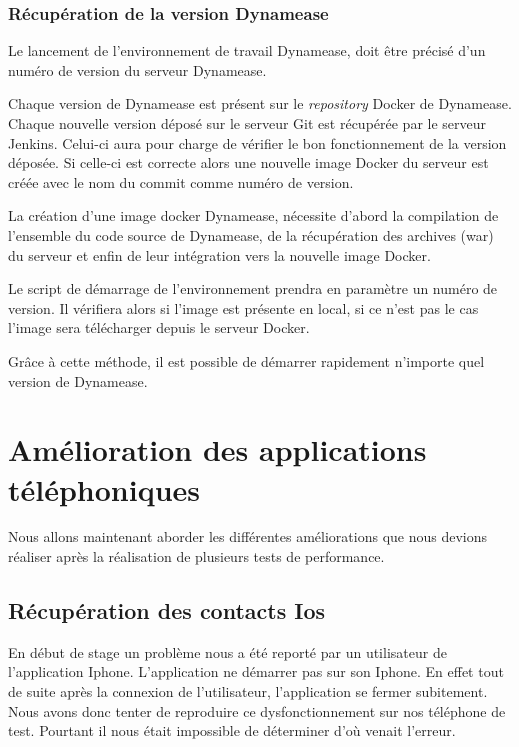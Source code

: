 \subsubsection{Récupération de la version Dynamease}

Le lancement de l'environnement de travail Dynamease, doit être précisé d'un numéro de version du serveur Dynamease. 

Chaque version de Dynamease est présent sur le \textit{repository} Docker de Dynamease. Chaque nouvelle version déposé sur le serveur Git est récupérée par le serveur Jenkins. Celui-ci aura pour charge de vérifier le bon fonctionnement de la version déposée. Si celle-ci est correcte alors une nouvelle image Docker du serveur est créée avec le nom du commit comme numéro de version.

La création d'une image docker Dynamease, nécessite d'abord la compilation de l'ensemble du code source de Dynamease, de la récupération des archives (war) du serveur et enfin de leur intégration vers la nouvelle image Docker.

Le script de démarrage de l'environnement prendra en paramètre un numéro de version. Il vérifiera alors si l'image est présente en local, si ce n'est pas le cas l'image sera télécharger depuis le serveur Docker.

Grâce à cette méthode, il est possible de démarrer rapidement n'importe quel version de Dynamease.

\section{Amélioration des applications téléphoniques}

Nous allons maintenant aborder les différentes améliorations que nous devions réaliser après la réalisation de plusieurs tests de performance.

\subsection{Récupération des contacts Ios}

En début de stage un problème nous a été reporté par un utilisateur de l'application Iphone. L'application ne démarrer pas sur son Iphone. En effet tout de suite après la connexion de l'utilisateur, l'application se fermer subitement. Nous avons donc tenter de reproduire ce dysfonctionnement sur nos téléphone de test. Pourtant il nous était impossible de déterminer d'où venait l'erreur.

